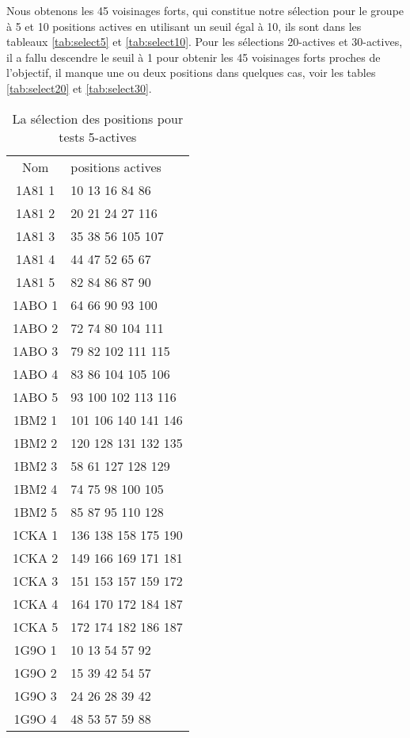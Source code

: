 Nous obtenons les 45 voisinages forts, qui constitue notre sélection pour le groupe à 5 et 10 positions actives en utilisant un seuil égal à 10, ils sont dans les tableaux \ref{tab:select5} et \ref{tab:select10}. Pour les sélections 20-actives et 30-actives, il a fallu descendre le seuil à 1 pour obtenir les 45 voisinages forts proches de l'objectif, il manque une ou deux positions dans quelques cas, voir les tables \ref{tab:select20} et \ref{tab:select30}.

\begin{table}[!htbp]
  \centering
  \caption{ La sélection des positions pour tests 5-actives }
    \begin{tabular}{cl}      
      \toprule
      Nom & positions actives \\
      \cmidrule{1-2}
      1A81 1 & 10 13 16 84 86 \\
      1A81 2 & 20 21 24 27 116 \\
      1A81 3 & 35 38 56 105 107 \\
      1A81 4 & 44 47 52 65 67 \\
      1A81 5 & 82 84 86 87 90 \\
      1ABO 1 & 64 66 90 93 100 \\
      1ABO 2 & 72 74 80 104 111 \\
      1ABO 3 & 79 82 102 111 115 \\
      1ABO 4 & 83 86 104 105 106 \\
      1ABO 5 & 93 100 102 113 116 \\
      1BM2 1 & 101 106 140 141 146 \\
      1BM2 2 & 120 128 131 132 135 \\
      1BM2 3 & 58 61 127 128 129 \\
      1BM2 4 & 74 75 98 100 105 \\
      1BM2 5 & 85 87 95 110 128 \\
      1CKA 1 & 136 138 158 175 190 \\
      1CKA 2 & 149 166 169 171 181 \\
      1CKA 3 & 151 153 157 159 172 \\
      1CKA 4 & 164 170 172 184 187 \\
      1CKA 5 & 172 174 182 186 187 \\
      1G9O 1 & 10 13 54 57 92 \\
      1G9O 2 & 15 39 42 54 57 \\
      1G9O 3 & 24 26 28 39 42 \\
      1G9O 4 & 48 53 57 59 88 \\

\end{tabular}
\end{table}
